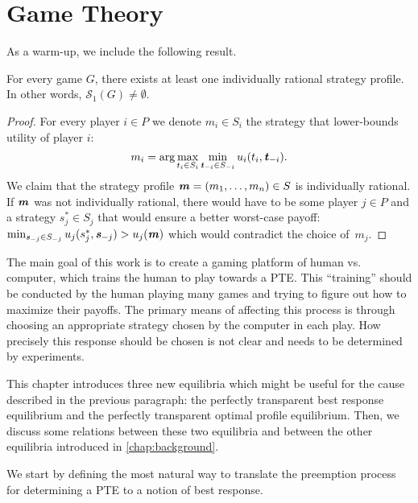 \chapter{Game Theory}
\label{chap:game-theory}

As a warm-up, we include the following result.

\begin{lemma}
	For every game $G$, there exists at least one individually rational strategy profile.
	In other words, $\mathcal{S}_1(G) \ne \emptyset$.
\end{lemma}

\begin{proof}
	For every player $i \in P$ we denote $m_i \in S_i$ the strategy that lower-bounds utility of player $i$:
	\[
		m_i = \text{arg} \max_{t_i \in S_i} \min_{\boldsymbol{\mathit{t}}_{-i} \in S_{-i}} u_i(t_i, \boldsymbol{\mathit{t}}_{-i}).
	\]
	We claim that the strategy profile $\boldsymbol{\mathit{m}} = (m_1, \dots, m_n) \in S$ is individually rational.
	If $\boldsymbol{\mathit{m}}$ was not individually rational, there would have to be some player $j \in P$ and a strategy $s_j^* \in S_j$ that would ensure a better worst-case payoff: $\min_{\boldsymbol{\mathit{s}}_{-j} \in S_{-j}}u_j(s_j^*, \boldsymbol{\mathit{s}}_{-j}) > u_j(\boldsymbol{\mathit{m}})$ which would contradict the choice of~$m_j$.
\end{proof}

The main goal of this work is to create a gaming platform of human vs. computer, which trains the human to play towards a PTE.
This \enquote{training} should be conducted by the human playing many games and trying to figure out how to maximize their payoffs.
The primary means of affecting this process is through choosing an appropriate strategy chosen by the computer in each play.
How precisely this response should be chosen is not clear and needs to be determined by experiments.

This chapter introduces three new equilibria which might be useful for the cause described in the previous paragraph: the perfectly transparent best response equilibrium and the perfectly transparent optimal profile equilibrium.
Then, we discuss some relations between these two equilibria and between the other equilibria introduced in \autoref{chap:background}.

We start by defining the most natural way to translate the preemption process for determining a PTE to a notion of best response.

